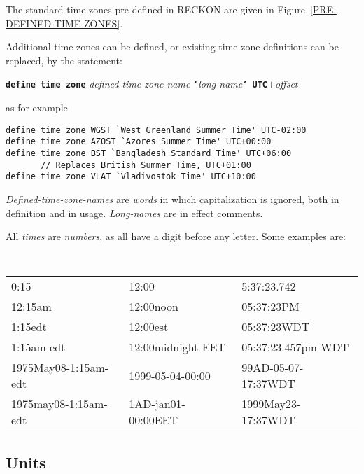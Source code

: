 \documentclass[12pt]{article}
\newcommand{\TT}[1]{{\tt \bfseries #1}}
\newenvironment{indpar}[1][0.3in]%
	{\begin{list}{}%
		     {\setlength{\itemsep}{0in}%
		      \setlength{\topsep}{0in}%
		      \setlength{\parsep}{1ex}%
		      \setlength{\labelwidth}{#1}%
		      \setlength{\leftmargin}{#1}%
		      \addtolength{\leftmargin}{\labelsep}}%
	 \item}%
	{\end{list}}
\begin{document}
The standard time zones pre-defined in RECKON are given in
Figure~\ref{PRE-DEFINED-TIME-ZONES}.

Additional time zones can be defined, or existing time zone
definitions can be replaced, by the statement:
\begin{center}
\TT{define time zone} {\em defined-time-zone-name}
    \TT{`}{\em long-name}\TT{' UTC}$\pm${\em offset}
\end{center}

as for example
\begin{indpar}\begin{verbatim}
define time zone WGST `West Greenland Summer Time' UTC-02:00
define time zone AZOST `Azores Summer Time' UTC+00:00
define time zone BST `Bangladesh Standard Time' UTC+06:00
       // Replaces British Summer Time, UTC+01:00
define time zone VLAT `Vladivostok Time' UTC+10:00
\end{verbatim}\end{indpar}

{\em Defined-time-zone-names} are {\em words} in which
capitalization is ignored, both in definition and in usage.
{\em Long-names} are in effect comments.

All {\em times} are {\em numbers}, as all have a digit before
any letter.  Some examples are:

\begin{indpar}[0.1in]
\tt
\begin{tabular}{@{}l@{~~}l@{~~}l@{}}
0:15	& 12:00   & 5:37:23.742 \\
12:15am	& 12:00noon   & 05:37:23PM \\
1:15edt	& 12:00est   & 05:37:23WDT \\
1:15am-edt	& 12:00midnight-EET   & 05:37:23.457pm-WDT \\
1975May08-1:15am-edt	& 1999-05-04-00:00   & 99AD-05-07-17:37WDT \\
1975may08-1:15am-edt	& 1AD-jan01-00:00EET   & 1999May23-17:37WDT \\
\end{tabular}
\end{indpar}

\subsection{Units}
\label{UNITS}
\end{document}

